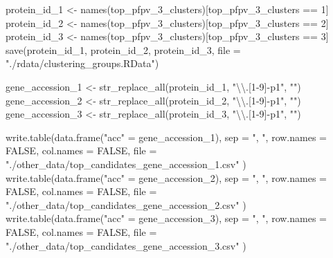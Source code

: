 \documentclass[
  11pt,
  oneside]{book}
\newenvironment{Shaded}{\begin{snugshade}}{\end{snugshade}}
\newcommand{\AttributeTok}[1]{\textcolor[rgb]{0.77,0.63,0.00}{#1}}
\newcommand{\ConstantTok}[1]{\textcolor[rgb]{0.00,0.00,0.00}{#1}}
\newcommand{\DecValTok}[1]{\textcolor[rgb]{0.00,0.00,0.81}{#1}}
\newcommand{\FunctionTok}[1]{\textcolor[rgb]{0.00,0.00,0.00}{#1}}
\newcommand{\NormalTok}[1]{#1}
\newcommand{\OtherTok}[1]{\textcolor[rgb]{0.56,0.35,0.01}{#1}}
\newcommand{\SpecialCharTok}[1]{\textcolor[rgb]{0.00,0.00,0.00}{#1}}
\newcommand{\StringTok}[1]{\textcolor[rgb]{0.31,0.60,0.02}{#1}}
\begin{document}
\begin{Shaded}
\begin{Highlighting}[]
\NormalTok{protein\_id\_1 }\OtherTok{\textless{}{-}} \FunctionTok{names}\NormalTok{(top\_pfpv\_3\_clusters)[top\_pfpv\_3\_clusters }\SpecialCharTok{==} \DecValTok{1}\NormalTok{]}
\NormalTok{protein\_id\_2 }\OtherTok{\textless{}{-}} \FunctionTok{names}\NormalTok{(top\_pfpv\_3\_clusters)[top\_pfpv\_3\_clusters }\SpecialCharTok{==} \DecValTok{2}\NormalTok{]}
\NormalTok{protein\_id\_3 }\OtherTok{\textless{}{-}} \FunctionTok{names}\NormalTok{(top\_pfpv\_3\_clusters)[top\_pfpv\_3\_clusters }\SpecialCharTok{==} \DecValTok{3}\NormalTok{]}
\FunctionTok{save}\NormalTok{(protein\_id\_1, protein\_id\_2, protein\_id\_3, }\AttributeTok{file =} \StringTok{"./rdata/clustering\_groups.RData"}\NormalTok{)}

\NormalTok{gene\_accession\_1 }\OtherTok{\textless{}{-}} \FunctionTok{str\_replace\_all}\NormalTok{(protein\_id\_1, }\StringTok{"}\SpecialCharTok{\textbackslash{}\textbackslash{}}\StringTok{.[1{-}9]{-}p1"}\NormalTok{, }\StringTok{""}\NormalTok{)}
\NormalTok{gene\_accession\_2 }\OtherTok{\textless{}{-}} \FunctionTok{str\_replace\_all}\NormalTok{(protein\_id\_2, }\StringTok{"}\SpecialCharTok{\textbackslash{}\textbackslash{}}\StringTok{.[1{-}9]{-}p1"}\NormalTok{, }\StringTok{""}\NormalTok{)}
\NormalTok{gene\_accession\_3 }\OtherTok{\textless{}{-}} \FunctionTok{str\_replace\_all}\NormalTok{(protein\_id\_3, }\StringTok{"}\SpecialCharTok{\textbackslash{}\textbackslash{}}\StringTok{.[1{-}9]{-}p1"}\NormalTok{, }\StringTok{""}\NormalTok{)}

\FunctionTok{write.table}\NormalTok{(}\FunctionTok{data.frame}\NormalTok{(}\StringTok{"acc"} \OtherTok{=}\NormalTok{ gene\_accession\_1),}
  \AttributeTok{sep =} \StringTok{", "}\NormalTok{, }\AttributeTok{row.names =} \ConstantTok{FALSE}\NormalTok{, }\AttributeTok{col.names =} \ConstantTok{FALSE}\NormalTok{,}
  \AttributeTok{file =} \StringTok{"./other\_data/top\_candidates\_gene\_accession\_1.csv"}
\NormalTok{)}
\FunctionTok{write.table}\NormalTok{(}\FunctionTok{data.frame}\NormalTok{(}\StringTok{"acc"} \OtherTok{=}\NormalTok{ gene\_accession\_2),}
  \AttributeTok{sep =} \StringTok{", "}\NormalTok{, }\AttributeTok{row.names =} \ConstantTok{FALSE}\NormalTok{, }\AttributeTok{col.names =} \ConstantTok{FALSE}\NormalTok{,}
  \AttributeTok{file =} \StringTok{"./other\_data/top\_candidates\_gene\_accession\_2.csv"}
\NormalTok{)}
\FunctionTok{write.table}\NormalTok{(}\FunctionTok{data.frame}\NormalTok{(}\StringTok{"acc"} \OtherTok{=}\NormalTok{ gene\_accession\_3),}
  \AttributeTok{sep =} \StringTok{", "}\NormalTok{, }\AttributeTok{row.names =} \ConstantTok{FALSE}\NormalTok{, }\AttributeTok{col.names =} \ConstantTok{FALSE}\NormalTok{,}
  \AttributeTok{file =} \StringTok{"./other\_data/top\_candidates\_gene\_accession\_3.csv"}
\NormalTok{)}
\end{Highlighting}
\end{Shaded}
\end{document}
